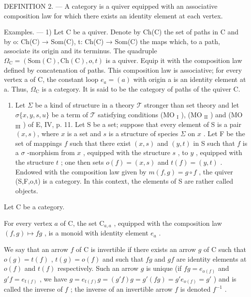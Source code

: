 DEFINITION 2. --- A category is a quiver equipped with an associative composition law for which there exists an identity element at each vertex.

Examples. --- 1) Let C be a quiver. Denote by Ch(C) the set of paths in C and by o: Ch(C) → Som(C), t: Ch(C) → Som(C) the maps which, to a path, associate its origin and its terminus. The quadruple \(\Omega_{\mathrm{C}} = (\mathrm{Som}(\mathrm{C}), \mathrm{Ch}(\mathrm{C}), o, t)\) is a quiver. Equip it with the composition law defined by concatenation of paths. This composition law is associative; for every vertex a of C, the constant loop \(e_a = (a)\) with origin a is an identity element at a. Thus, \(\Omega_{\mathrm{C}}\) is a category. It is said to be the category of paths of the quiver C.

\begin{enumerate}
\def\labelenumi{\arabic{enumi})}
\setcounter{enumi}{1}
\tightlist
\item
  Let \(\Sigma\) be a kind of structure in a theory \(\mathcal{T}\) stronger than set theory and let \(\sigma\{x,y,s,u\}\) be a term of \(\mathcal{T}\) satisfying conditions (MO \(_{\text{I}}\) ), (MO \(_{\text{II}}\) ) and (MO \(_{\text{III}}\) ) of E, IV, p. 11. Let S be a set; suppose that every element of S is a pair \((x,s)\), where \(x\) is a set and \(s\) is a structure of species \(\Sigma\) on \(x\) . Let F be the set of mappings \(f\) such that there exist \((x,s)\) and \((y,t)\) in S such that \(f\) is a \(\sigma\) -morphism from \(x\) , equipped with the structure \(s\) , to \(y\) , equipped with the structure \(t\) ; one then sets \(o(f) = (x,s)\) and \(t(f) = (y,t)\) . Endowed with the composition law given by \(m(f,g)=g\circ f\) , the quiver (S,F,o,t) is a category. In this context, the elements of S are rather called objects.
\end{enumerate}

Let C be a category.

For every vertex \(a\) of C, the set \(\mathrm{C}_{a,a}\) , equipped with the composition law \((f,g)\mapsto fg\) , is a monoid with identity element \(e_a\) .

We say that an arrow \(f\) of C is invertible if there exists an arrow \(g\) of C such that \(o(g) = t(f)\) , \(t(g) = o(f)\) and such that \(fg\) and \(gf\) are identity elements at \(o(f)\) and \(t(f)\) respectively. Such an arrow \(g\) is unique (if \(fg = e_{o(f)}\) and \(g'f = e_{t(f)}\) , we have \(g = e_{t(f)}g = (g'f)g = g'(fg) = g'e_{o(f)} = g'\) ) and is called the inverse of \(f\) ; the inverse of an invertible arrow \(f\) is denoted \(f^{-1}\) .

